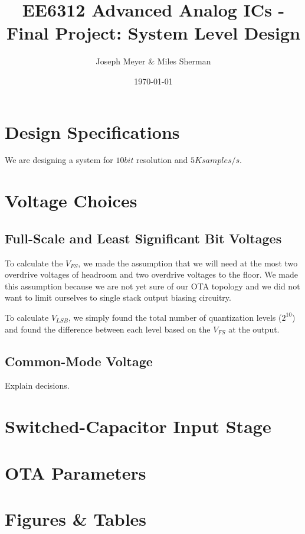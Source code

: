 \documentclass{article}
\begin{document}
\title{EE6312 Advanced Analog ICs - Final Project: System Level Design}
\author{Joseph Meyer \& Miles Sherman}
\date{\today}
\maketitle

\section{Design Specifications}
We are designing a system for $10 bit$ resolution and $5K samples/s$.

\section{Voltage Choices}
\subsection{Full-Scale and Least Significant Bit Voltages}
To calculate the $V_{FS}$, we made the assumption that we will need at the most two overdrive voltages of headroom and two overdrive voltages to the floor. We made this assumption because we are not yet sure of our OTA topology and we did not want to limit ourselves to single stack output biasing circuitry. 

To calculate $V_{LSB}$, we simply found the total number of quantization levels ($2^{10}$) and found the difference between each level based on the $V_{FS}$ at the output.

\subsection{Common-Mode Voltage}
Explain decisions.

\section{Switched-Capacitor Input Stage}

\section{OTA Parameters}




\section{Figures \& Tables}
\end{document}
